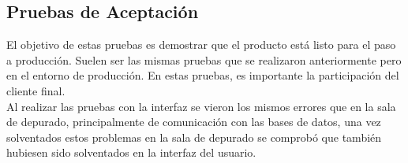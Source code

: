 \subsection{Pruebas de Aceptación}
El objetivo de estas pruebas es demostrar que el producto está listo para el paso a producción. Suelen ser las mismas pruebas que se realizaron anteriormente pero en el entorno de producción. En estas pruebas, es importante la participación del cliente final.\\

Al realizar las pruebas con la interfaz se vieron los mismos errores que en la sala de depurado, principalmente de comunicación con las bases de datos, una vez solventados estos problemas en la sala de depurado se comprobó que también hubiesen sido solventados en la interfaz del usuario.